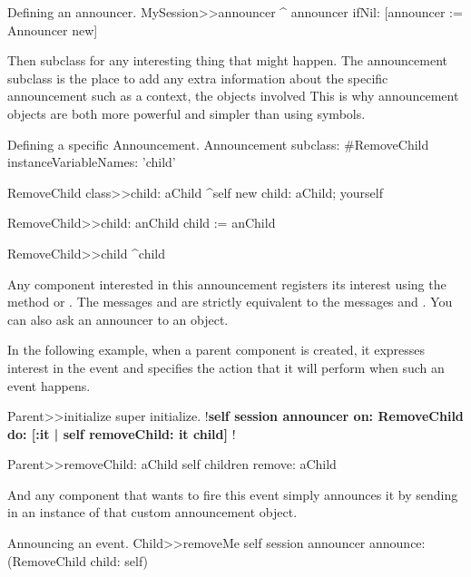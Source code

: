 \documentclass[a4paper,10pt,twoside]{book}
\begin{document}
\begin{method}{Defining an announcer.}
MySession>>announcer
    ^ announcer ifNil: [announcer := Announcer new]
\end{method}

Then subclass  for any interesting thing that
might happen. The announcement subclass is the place to add any extra
information about the specific announcement such as a context, the
objects involved \etc This is why announcement objects are both more
powerful and simpler than using symbols.

\begin{classdef}{Defining a specific Announcement.}
Announcement subclass: #RemoveChild
    instanceVariableNames: 'child'

RemoveChild class>>child: aChild
    ^self new
        child: aChild;
        yourself

RemoveChild>>child: anChild
    child := anChild

RemoveChild>>child
    ^child
\end{classdef}

Any component interested in this announcement registers its interest
using the method 
or .  The messages
 and  are strictly equivalent to the
messages   and
. You can also ask an announcer to
 an object.

In the following example, when a parent component is created, it
expresses interest in the  event and specifies the
action that it will perform when such an event happens.

\begin{method}{}
Parent>>initialize
    super initialize.
    !\textbf{self session announcer on: RemoveChild do: [:it | self removeChild: it child] }!

Parent>>removeChild: aChild
    self children remove: aChild
\end{method}

And any component that wants to fire this event simply announces it by
sending in an instance of that custom announcement object.

\begin{method}{Announcing an event.}
Child>>removeMe
    self session announcer announce: (RemoveChild child: self)
\end{method}
\end{document}
